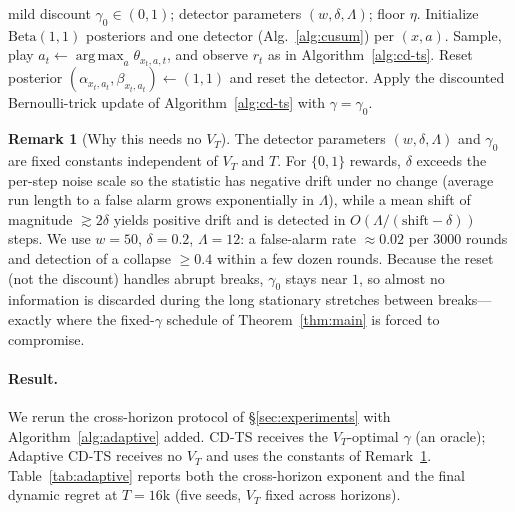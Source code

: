 \documentclass[11pt]{article}
\theoremstyle{definition}
\newtheorem{remark}{Remark}
\newcommand{\Beta}{\mathrm{Beta}}
\DeclareMathOperator*{\argmax}{arg\,max}
\begin{document}
\begin{algorithm}[h]
\caption{Adaptive CD-TS (no $V_T$)}
\label{alg:adaptive}
\begin{algorithmic}[1]
\Require mild discount $\gamma_0 \in (0,1)$; detector parameters $(w,\delta,\Lambda)$; floor $\eta$.
\State Initialize $\Beta(1,1)$ posteriors and one detector (Alg.~\ref{alg:cusum}) per $(x,a)$.
    \State Sample, play $a_t \gets \argmax_a \theta_{x_t,a,t}$, and observe $r_t$ as in Algorithm~\ref{alg:cd-ts}.
        \State Reset posterior $(\alpha_{x_t,a_t},\beta_{x_t,a_t}) \gets (1,1)$ and reset the detector.
    \Else
        \State Apply the discounted Bernoulli-trick update of Algorithm~\ref{alg:cd-ts} with $\gamma=\gamma_0$.
    \EndIf
\EndFor
\end{algorithmic}
\end{algorithm}

\begin{remark}[Why this needs no $V_T$]
\label{rem:no-vt}
The detector parameters $(w,\delta,\Lambda)$ and $\gamma_0$ are fixed constants
independent of $V_T$ and $T$. For $\{0,1\}$ rewards, $\delta$ exceeds the
per-step noise scale so the statistic has negative drift under no change
(average run length to a false alarm grows exponentially in $\Lambda$), while a
mean shift of magnitude $\gtrsim 2\delta$ yields positive drift and is detected
in $O(\Lambda/(\text{shift}-\delta))$ steps. We use $w{=}50$, $\delta{=}0.2$,
$\Lambda{=}12$: a false-alarm rate $\approx 0.02$ per $3000$ rounds and
detection of a collapse $\geq 0.4$ within a few dozen rounds. Because the reset
(not the discount) handles abrupt breaks, $\gamma_0$ stays near $1$, so almost
no information is discarded during the long stationary stretches between
breaks---exactly where the fixed-$\gamma$ schedule of Theorem~\ref{thm:main} is
forced to compromise.
\end{remark}

\paragraph{Result.}
We rerun the cross-horizon protocol of \S\ref{sec:experiments} with
Algorithm~\ref{alg:adaptive} added. CD-TS receives the $V_T$-optimal $\gamma$
(an oracle); Adaptive CD-TS receives no $V_T$ and uses the constants of
Remark~\ref{rem:no-vt}. Table~\ref{tab:adaptive} reports both the cross-horizon
exponent and the final dynamic regret at $T{=}16\mathrm{k}$ (five seeds, $V_T$
fixed across horizons).
\end{document}
